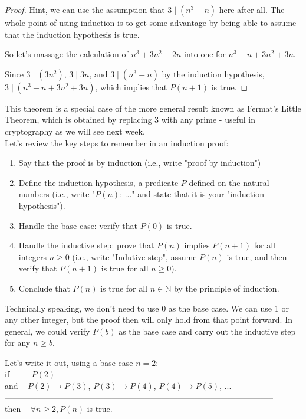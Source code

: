 \documentclass[12pt]{article}
\begin{document}
{\begin{proof}
Hint, we can use the assumption that $3 \mid (n^3-n)$ here after all.  The whole point of 
using induction is to get some advantage by being able to assume that the induction hypothesis is true.

So let's massage the calculation of $n^3+3n^2+2n$ into one for $n^3-n+3n^2+3n$. 

Since $3 \mid (3n^2)$, $3 \mid 3n$, and $3 \mid (n^3-n)$ 
by the induction hypothesis, 
$3 \mid (n^3-n+3n^2+3n)$, which implies that $P(n+1)$ is true.

\end{proof}

This theorem is a special case of the more general result known as Fermat's Little Theorem, 
which is obtained by replacing 3 with any prime - useful in cryptography as we will see next week.
\\

Let's review the key steps to remember in an induction proof:
\begin{enumerate}
\item Say that the proof is by induction (i.e., write "proof by induction")
\item Define the induction hypothesis, a predicate $P$ defined on the
natural numbers (i.e., write "$P(n)$: ..." and state that it is your "induction hypothesis").
\item Handle the base case: verify that $P(0)$ is true.
\item Handle the inductive step: prove that $P(n)$ implies $P(n+1)$
for all integers $n \ge 0$ (i.e., write "Indutive step", assume $P(n)$ is true, and then verify that 
$P(n+1)$ is true for all $n \ge 0$).
\item Conclude that $P(n)$ is true for all $n \in \mathbb{N}$ by the
principle of induction.
\end{enumerate}

Technically speaking, we don't need to use 0 as the base case.   We can use 1 or any other integer, 
but the proof then will only hold from that point forward.  In general, we could verify $P(b)$ as the 
base case and carry out the inductive step for any $n \ge b$.

Let's write it out, using a base case $n = 2$: \\
if      ~~~ ~$P(2)$
\\
and    ~ $P(2) \rightarrow P(3)$, $P(3) \rightarrow P(4)$, $P(4) \rightarrow P(5)$, ... 
\\
--------------------------------------------------------------------------------------------------
\\
then  ~ $\forall n \ge 2, P(n)$ is true. 

}
\newpage
\fi
\end{document}
